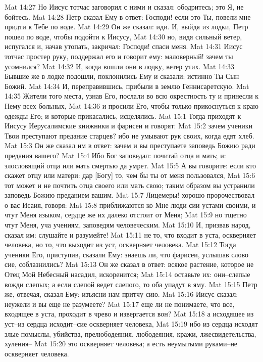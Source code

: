 Mat 14:27  Но Иисус тотчас заговорил с ними и сказал: ободритесь; это Я, не бойтесь.
Mat 14:28  Петр сказал Ему в ответ: Господи! если это Ты, повели мне придти к Тебе по воде.
Mat 14:29  Он же сказал: иди. И, выйдя из лодки, Петр пошел по воде, чтобы подойти к Иисусу,
Mat 14:30  но, видя сильный ветер, испугался и, начав утопать, закричал: Господи! спаси меня.
Mat 14:31  Иисус тотчас простер руку, поддержал его и говорит ему: маловерный! зачем ты усомнился?
Mat 14:32  И, когда вошли они в лодку, ветер утих.
Mat 14:33  Бывшие же в лодке подошли, поклонились Ему и сказали: истинно Ты Сын Божий.
Mat 14:34  И, переправившись, прибыли в землю Геннисаретскую.
Mat 14:35  Жители того места, узнав Его, послали во всю окрестность ту и принесли к Нему всех больных,
Mat 14:36  и просили Его, чтобы только прикоснуться к краю одежды Его; и которые прикасались, исцелялись.
Mat 15:1  Тогда приходят к Иисусу Иерусалимские книжники и фарисеи и говорят:
Mat 15:2  зачем ученики Твои преступают предание старцев? ибо не умывают рук своих, когда едят хлеб.
Mat 15:3  Он же сказал им в ответ: зачем и вы преступаете заповедь Божию ради предания вашего?
Mat 15:4  Ибо Бог заповедал: почитай отца и мать; и: злословящий отца или мать смертью да умрет.
Mat 15:5  А вы говорите: если кто скажет отцу или матери: дар [Богу] то, чем бы ты от меня пользовался,
Mat 15:6  тот может и не почтить отца своего или мать свою; таким образом вы устранили заповедь Божию преданием вашим.
Mat 15:7  Лицемеры! хорошо пророчествовал о вас Исаия, говоря:
Mat 15:8  приближаются ко Мне люди сии устами своими, и чтут Меня языком, сердце же их далеко отстоит от Меня;
Mat 15:9  но тщетно чтут Меня, уча учениям, заповедям человеческим.
Mat 15:10  И, призвав народ, сказал им: слушайте и разумейте!
Mat 15:11  не то, что входит в уста, оскверняет человека, но то, что выходит из уст, оскверняет человека.
Mat 15:12  Тогда ученики Его, приступив, сказали Ему: знаешь ли, что фарисеи, услышав слово сие, соблазнились?
Mat 15:13  Он же сказал в ответ: всякое растение, которое не Отец Мой Небесный насадил, искоренится;
Mat 15:14  оставьте их: они--слепые вожди слепых; а если слепой ведет слепого, то оба упадут в яму.
Mat 15:15  Петр же, отвечая, сказал Ему: изъясни нам притчу сию.
Mat 15:16  Иисус сказал: неужели и вы еще не разумеете?
Mat 15:17  еще ли не понимаете, что все, входящее в уста, проходит в чрево и извергается вон?
Mat 15:18  а исходящее из уст--из сердца исходит--сие оскверняет человека,
Mat 15:19  ибо из сердца исходят злые помыслы, убийства, прелюбодеяния, любодеяния, кражи, лжесвидетельства, хуления--
Mat 15:20  это оскверняет человека; а есть неумытыми руками--не оскверняет человека.
